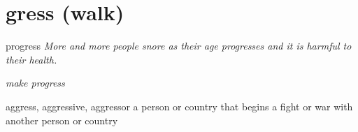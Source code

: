 \chapter{gress (walk)}

\begin{word}{progress}
    \textit{More and more people snore as their age progresses and it is harmful to their health.}

    \textit{make progress}
\end{word}

\begin{word}{aggress, aggressive, aggressor}
    a person or country that begins a fight or war with another person or country
\end{word}